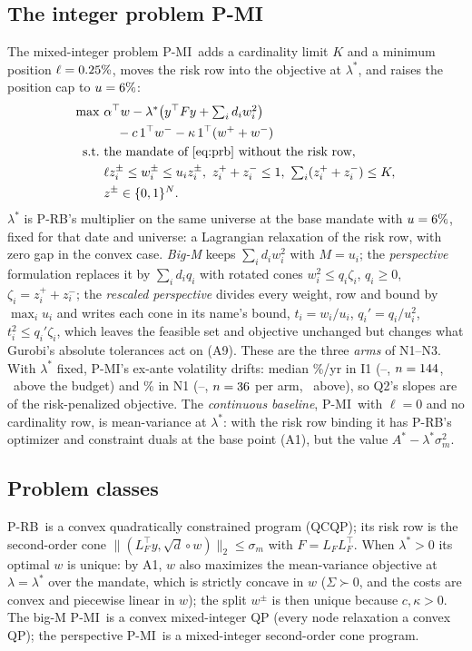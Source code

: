 \documentclass[conference]{IEEEtran}
\newcommand{\T}{^{\top}}
\newcommand{\pmi}{\mbox{P-MI}}
\newcommand{\prb}{\mbox{P-RB}}
\begin{document}
\subsection{The integer problem \pmi}
The mixed-integer problem \pmi\ adds a cardinality limit $K$ and a minimum position $\ell=0.25\%$, moves the risk row into the objective at $\lambda^*$, and raises the position cap to $u=6\%$:
\begin{equation}
\begin{aligned}
\max\ & \alpha\T w-\lambda^*\big(y\T Fy+\textstyle\sum_i d_iw_i^2\big)\\
& \quad -c\,1\T w^- -\kappa\,1\T(w^++w^-)\\
\text{s.t.}\ & \text{the mandate of \eqref{eq:prb} without the risk row},\\
& \ell z_i^\pm\le w_i^\pm\le u_iz_i^\pm,\ z_i^++z_i^-\le1,\ \textstyle\sum_i(z_i^++z_i^-)\le K,\\
& z^\pm\in\{0,1\}^N .
\end{aligned}
\label{eq:pmi}
\end{equation}
$\lambda^*$ is \prb's multiplier on the same universe at the base mandate with $u=6\%$, fixed for that date and universe: a Lagrangian relaxation of the risk row, with zero gap in the convex case. \emph{Big-M} keeps $\sum_id_iw_i^2$ with $M=u_i$; the \emph{perspective} formulation replaces it by $\sum_id_iq_i$ with rotated cones $w_i^2\le q_i\zeta_i$, $q_i\ge0$, $\zeta_i=z_i^++z_i^-$; the \emph{rescaled perspective} divides every weight, row and bound by $\max_iu_i$ and writes each cone in its name's bound, $t_i=w_i/u_i$, $q_i'=q_i/u_i^2$, $t_i^2\le q_i'\zeta_i$, which leaves the feasible set and objective unchanged but changes what Gurobi's absolute tolerances act on (A9). These are the three \emph{arms} of N1--N3. With $\lambda^*$ fixed, \pmi's ex-ante volatility drifts: median \VolIOneMed\%/yr in I1 (\VolIOneMin--\VolIOneMax, $n=144$, \VolIOneAbove\ above the budget) and \VolNOneMed\% in N1 (\VolNOneMin--\VolNOneMax, $n=36$ per arm, \VolNOneAbove\ above), so Q2's slopes are of the risk-penalized objective. The \emph{continuous baseline}, \pmi\ with $\ell=0$ and no cardinality row, is mean-variance at $\lambda^*$: with the risk row binding it has \prb's optimizer and constraint duals at the base point (A1), but the value $A^*-\lambda^*\sigma_m^2$.

\subsection{Problem classes}
\prb\ is a convex quadratically constrained program (QCQP); its risk row is the second-order cone $\|(L_F\T y,\sqrt d\circ w)\|_2\le\sigma_m$ with $F=L_FL_F\T$. When $\lambda^*>0$ its optimal $w$ is unique: by A1, $w$ also maximizes the mean-variance objective at $\lambda=\lambda^*$ over the mandate, which is strictly concave in $w$ ($\Sigma\succ0$, and the costs are convex and piecewise linear in $w$); the split $w^\pm$ is then unique because $c,\kappa>0$. The big-M \pmi\ is a convex mixed-integer QP (every node relaxation a convex QP); the perspective \pmi\ is a mixed-integer second-order cone program.
\end{document}
